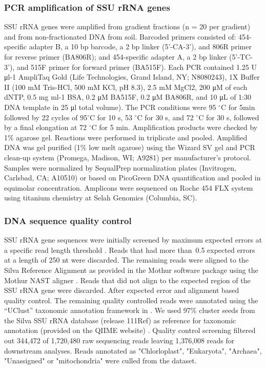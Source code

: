 \documentclass{article}
\begin{document}
\subsubsection{PCR amplification of SSU rRNA genes} 
SSU rRNA genes were amplified from gradient fractions (n = 20 per gradient) and
from non-fractionated DNA from soil. Barcoded primers consisted of:
454-specific adapter B, a 10 bp barcode, a 2 bp linker (5’-CA-3’), and 806R
primer for reverse primer (BA806R); and 454-specific adapter A, a 2 bp linker
(5’-TC-3’), and 515F primer for forward primer (BA515F). Each PCR contained
1.25 U μl-1 AmpliTaq Gold (Life Technologies, Grand Island, NY; N8080243), 1X
Buffer II (100 mM Tris-HCl, 500 mM KCl, pH 8.3), 2.5 mM MgCl2, 200 μM of each
dNTP, 0.5 mg ml-1 BSA, 0.2 μM BA515F, 0.2 μM BA806R, and 10 μL of 1:30 DNA
template in 25 μl total volume). The PCR conditions were 95 $^{\circ}$C for
5min followed by 22 cycles of 95$^{\circ}$C for 10 s, 53 $^{\circ}$C for 30 s,
and 72 $^{\circ}$C for 30 s, followed by a final elongation at 72 $^{\circ}$C
for 5 min. Amplification products were checked by 1\% agarose gel. Reactions
were performed in triplicate and pooled.  Amplified DNA was gel purified (1\%
low melt agarose) using the Wizard SV gel and PCR clean-up system (Promega,
Madison, WI; A9281) per manufacturer’s protocol. Samples were normalized by
SequalPrep normalization plates (Invitrogen, Carlsbad, CA; A10510) or based on
PicoGreen DNA quantification and pooled in equimolar concentration. Amplicons
were sequenced on Roche 454 FLX system using titanium chemistry at Selah
Genomics (Columbia, SC).

\subsubsection{DNA sequence quality control}
SSU rRNA gene sequences were initially screened by maximum expected errors
at a specific read length threshold \citep{edgar2013}. Reads that had more
than~0.5 expected errors at a length of 250 nt were discarded. The
remaining reads were aligned to the Silva Reference Alignment as provided
in the Mothur software package using the Mothur NAST aligner
\citep{DeSantis2005,schloss2009}. Reads that did not align to the expected
region of the SSU rRNA gene were discarded. After expected error and
alignment based quality control. The remaining quality controlled reads
were annotated using the “UClust” taxonomic annotation framework in
\citep{caporaso2010,edgar2010}. We used 97\% cluster seeds from the Silva
SSU rRNA database (release 111Ref) \citep{quast2013} as reference for
taxonomic annotation (provided on the QIIME website) \citep{quast2013}.
Quality control screening filtered out 344,472 of 1,720,480 raw sequencing
reads leaving 1,376,008 reads for downstream analyses. Reads annotated as
"Chlorloplast", "Eukaryota", "Archaea", "Unassigned" or "mitochondria" were
culled from the dataset. 
\end{document}
